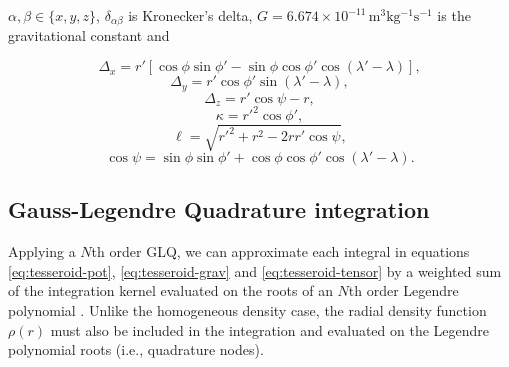 \documentclass[extra]{gji}
\begin{document}
\noindent $\alpha, \beta \in \{x, y, z\}$, $\delta_{\alpha\beta}$ is Kronecker's delta,
$G = 6.674\times10^{-11}\, \text{m$^3$kg$^{-1}$s$^{-1}$}$ is the gravitational constant
and

\begin{equation}
    \Delta_x = r'[\cos\phi\sin\phi' - \sin\phi\cos\phi'
               \cos(\lambda' - \lambda)],
\end{equation}
\begin{equation}
    \Delta_y = r' \cos \phi' \sin(\lambda' - \lambda),
\end{equation}
\begin{equation}
    \Delta_z = r' \cos \psi - r,
\end{equation}
\begin{equation}
    \kappa = {r'}^2 \cos \phi',
\end{equation}
\begin{equation}
    \ell = \sqrt{{r'}^2 + r^2 - 2 r r' \cos \psi},
\label{eq:ell}
\end{equation}
\begin{equation}
    \cos\psi = \sin\phi\sin\phi' + \cos\phi\cos\phi'
                 \cos(\lambda' - \lambda).
\label{eq:cospsi}
\end{equation}

\subsection{Gauss-Legendre Quadrature integration}

Applying a $N$th order GLQ, we can approximate each integral in equations
\ref{eq:tesseroid-pot}, \ref{eq:tesseroid-grav} and \ref{eq:tesseroid-tensor} by a
weighted sum of the integration kernel evaluated on the roots of an $N$th order Legendre
polynomial \citep[p.~390]{Hildebrand1987}.
Unlike the homogeneous density case, the radial density function $\rho(r)$ must also be
included in the integration and evaluated on the Legendre polynomial roots (i.e.,
quadrature nodes).

\end{document}
